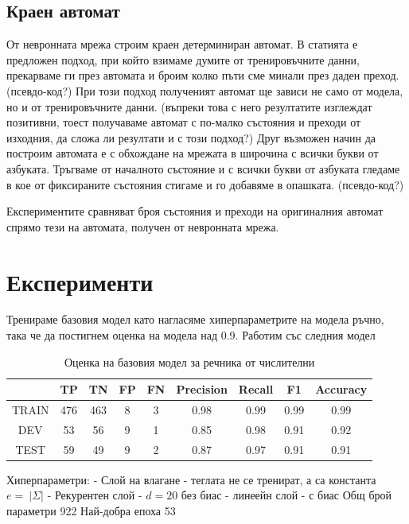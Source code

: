 \documentclass[a4paper,12pt]{article}
\begin{document}
\subsection{Краен автомат}

От невронната мрежа строим краен детерминиран автомат. В статията \cite{citation06} е предложен подход, при който взимаме думите от тренировъчните данни, прекарваме ги през автомата и броим колко пъти сме минали през даден преход.(псевдо-код?) При този подход полученият автомат ще зависи не само от модела, но и от тренировъчните данни. (въпреки това с него резултатите изглеждат позитивни, тоест получаваме автомат с по-малко състояния и преходи от изходния, да сложа ли резултати и с този подход?)
Друг възможен начин да построим автомата е с обхождане на мрежата в широчина с всички букви от азбуката. Тръгваме от началното състояние и с всички букви от азбуката гледаме в кое от фиксираните състояния стигаме и го добавяме в опашката. (псевдо-код?)

Експериментите сравняват броя състояния и преходи на оригиналния автомат спрямо тези на автомата, получен от невронната мрежа. 

\pagebreak

\section{Експерименти}


Тренираме базовия модел като нагласяме хиперпараметрите на модела ръчно, така че да постигнем оценка на модела над 0.9. Работим със следния модел

\begin{table}[h!]
\centering
\begin{tabular}{|c|c|c|c|c|c|c|c|c|}
\hline
 & TP & TN & FP & FN & Precision & Recall & F1 & Accuracy\\
\hline
TRAIN & 476 & 463 & 8 & 3 & 0.98 & 0.99 & 0.99 & 0.99\\
\hline
DEV & 53 & 56 & 9 & 1 & 0.85 & 0.98 & 0.91 & 0.92\\
\hline
TEST & 59 & 49 & 9 & 2 & 0.87 & 0.97 & 0.91 & 0.91\\
\hline
\end{tabular}
\caption{Оценка на базовия модел за речника от числителни}
\label{table:5}
\end{table}

Хиперпараметри:
- Слой на влагане - теглата не се тренират, а са константа $e =\:|\Sigma|$ 
- Рекурентен слой - $d = 20$ без биас
- линеейн слой - с биас 
Общ брой параметри  922
Най-добра епоха 53
\end{document}
